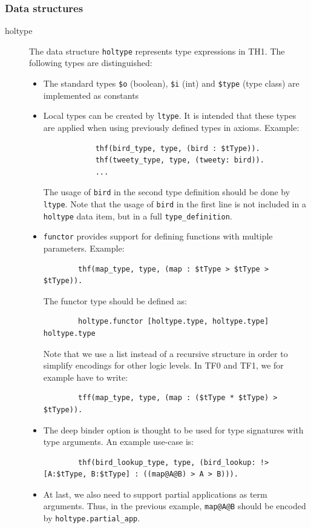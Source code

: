 \documentclass[a4paper]{article}
\begin{document}
\subsubsection{Data structures} 
\begin{description}
	\item[holtype] The data structure \texttt{holtype} represents type expressions in TH1. The following types are distinguished:
	\begin{itemize}
		\item The standard types \texttt{\$o} (boolean), \texttt{\$i} (int) and \texttt{\$type} (type class) are implemented as constants
		\item Local types can be created by \texttt{ltype}. It is intended that these types are applied when using previously defined types in axioms. Example:
		\begin{verbatim}
			thf(bird_type, type, (bird : $tType)).
			thf(tweety_type, type, (tweety: bird)).
			...
		\end{verbatim}
		The usage of \texttt{bird} in the second type definition should be done by \texttt{ltype}. Note that the usage of \texttt{bird} in the first line is not included in a \texttt{holtype} data item, but in a full \texttt{type\_definition}. 
		\item \texttt{functor} provides support for defining functions with multiple parameters. Example:
		\begin{verbatim}
		thf(map_type, type, (map : $tType > $tType > $tType)).
		\end{verbatim}
		The functor type should be defined as:
		\begin{verbatim}
		holtype.functor [holtype.type, holtype.type] holtype.type
		\end{verbatim}
		Note that we use a list instead of a recursive structure in order to simplify encodings for other logic levels. In TF0 and TF1, we for example have to write: 
		\begin{verbatim}
		tff(map_type, type, (map : ($tType * $tType) > $tType)).
		\end{verbatim}
		\item The deep binder option is thought to be used for type signatures with type arguments. An example use-case is:
		\begin{verbatim}
		thf(bird_lookup_type, type, (bird_lookup: !>[A:$tType, B:$tType] : ((map@A@B) > A > B))).
		\end{verbatim}
		\item At last, we also need to support partial applications as term arguments. Thus, in the previous example, \texttt{map@A@B} should be encoded by \texttt{holtype.partial\_app}.

\end{itemize}
\end{description}
\end{document}
